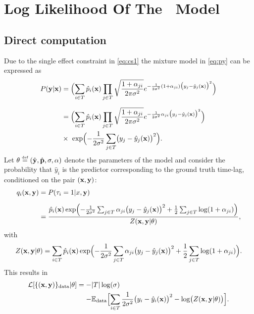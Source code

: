 \chapter{Log Likelihood Of The \XX \ Model}\label{app:LL}

\section*{Direct computation}
Due to the single effect constraint in \cref{eq:cs1} the mixture model in 
\cref{eq:py} can be expressed as  
\begin{align*}
P({\bf y}\vert \mathbf{x}) &= \Bigl(\sum_{i\in T}\hat p_i(\mathbf{x})\prod_{j\in T}\sqrt{\frac{1+\alpha_{ji}}{2\pi\sigma^2}}e^{-\frac{1}{2\sigma^2}(1+\alpha_{ji})\bigl(y_j-\hat y_j(\mathbf{x})\bigr)^2}\Bigr)\\[0.2cm]
&= \Bigl(\sum_{i\in T}\hat p_i(\mathbf{x})\prod_{j\in T}\sqrt{\frac{1+\alpha_{ji}}{2\pi\sigma^2}}e^{-\frac{1}{2\sigma^2}\alpha_{ji}\bigl(y_j-\hat y_j(\mathbf{x})\bigr)^2}\Bigr) \\
&\times \ \exp\Bigl(-\frac{1}{2\sigma^2}\sum_{j\in T}\bigl(y_j-\hat y_j(\mathbf{x})\bigr)^2\Bigr).
\end{align*}
Let $\theta \stackrel{\mbox{\upshape\tiny def}}{=} (\hat {\bf y},\hat{\bf p},\sigma,{\bf \alpha})$ denote the 
parameters of the model and consider the probability that $\hat y_i$ is the 
predictor corresponding to the ground truth time-lag, conditioned on the pair 
$(\mathbf{x},{\bf y})$: 
\begin{align*}
  q_i(\mathbf{x},{\bf y}) &= P(\tau_i=1 \vert x,{\bf y})\\[0.2cm]
  &= \frac{\hat p_i(\mathbf{x})\exp\Bigl(-\frac{1}{2\sigma^2}\sum_{j\in  T}\alpha_{ji}\bigl(y_j-\hat y_j(\mathbf{x})\bigr)^2+\frac{1}{2}\sum_{j\in  T}\log(1+\alpha_{ji})\Bigr)}{Z(\mathbf{x},{\bf y}\vert\theta)},
\end{align*}
with
\[
Z(\mathbf{x},{\bf y}\vert\theta) = \sum_{i\in T}  \hat p_i(\mathbf{x})\exp\Bigl(-\frac{1}{2\sigma^2}\sum_{j\in  T}\alpha_{ji}\bigl(y_j-\hat y_j(\mathbf{x})\bigr)^2+\frac{1}{2}\sum_{j\in  T}\log(1+\alpha_{ji})\Bigr).
\]
This results in 
\begin{align*}
  {\cal L}[\{(\mathbf{x},{\bf y})\}_{\rm data}\vert\theta] = - & \vert  T\vert\log(\sigma) \\ 
  - & {\mathbb E}_{\rm data}\Bigl[\sum_{i\in T}\frac{1}{2\sigma^2}\bigl(y_i-\hat y_i(\mathbf{x})\bigr)^2-\log\bigl(Z(\mathbf{x},{\bf y}\vert\theta)\bigr)\Bigr].
\end{align*}

